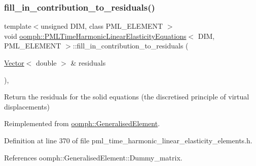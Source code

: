 \subsubsection{\texorpdfstring{fill\+\_\+in\+\_\+contribution\+\_\+to\+\_\+residuals()}{fill\_in\_contribution\_to\_residuals()}}
{\footnotesize\ttfamily template$<$unsigned D\+IM, class P\+M\+L\+\_\+\+E\+L\+E\+M\+E\+NT $>$ \\
void \hyperlink{classoomph_1_1PMLTimeHarmonicLinearElasticityEquations}{oomph\+::\+P\+M\+L\+Time\+Harmonic\+Linear\+Elasticity\+Equations}$<$ D\+IM, P\+M\+L\+\_\+\+E\+L\+E\+M\+E\+NT $>$\+::fill\+\_\+in\+\_\+contribution\+\_\+to\+\_\+residuals (\begin{DoxyParamCaption}\item[{\hyperlink{classoomph_1_1Vector}{Vector}$<$ double $>$ \&}]{residuals }\end{DoxyParamCaption})\hspace{0.3cm}{\ttfamily [inline]}, {\ttfamily [virtual]}}



Return the residuals for the solid equations (the discretised principle of virtual displacements) 



Reimplemented from \hyperlink{classoomph_1_1GeneralisedElement_a310c97f515e8504a48179c0e72c550d7}{oomph\+::\+Generalised\+Element}.



Definition at line 370 of file pml\+\_\+time\+\_\+harmonic\+\_\+linear\+\_\+elasticity\+\_\+elements.\+h.



References oomph\+::\+Generalised\+Element\+::\+Dummy\+\_\+matrix.

\mbox{\label{classoomph_1_1PMLTimeHarmonicLinearElasticityEquations_a18ad8f22b1d4c8055d09e7fd9e87df4d}} 
